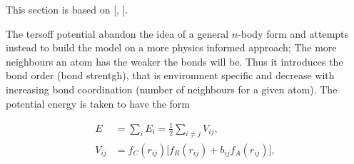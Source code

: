 This section is based on [\cite{docs_lammps_tersoff}, \cite{PhysRevB.37.6991}].


The tersoff potential abandon the idea of a general $n$-body form and attempts
instead to build the model on a more physics informed approach; The more
neighbours an atom has the weaker the bonds will be. Thus it introduces the bond
order (bond strentgh), that is environment specific and decrease with increasing
bond coordination (number of neighbours for a given atom). The potential energy
is taken to have the form

\begin{align*}
  E &= \sum_i E_i = \frac{1}{2}\sum_{i \ne j} V_{ij}, \\
  V_{ij} &= f_C(r_{ij}) \big[f_R(r_{ij}) + b_{ij}f_A(r_{ij})  \big],
\end{align*}


